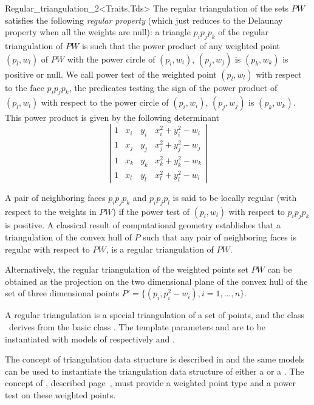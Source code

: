 \begin{ccRefClass}{Regular_triangulation_2<Traits,Tds>}
The regular triangulation of the sets ${  PW}$
satisfies the following {\em regular property} (which just reduces to the 
Delaunay property when all the weights are null):
a triangle $p_ip_jp_k$ of the regular triangulation
of ${  PW}$ is such that the power product of any weighted point
 $(p_l, w_l)$ of ${  PW}$ with the power circle of
 $(p_i, w_i)$, $(p_j, w_j)$ is $(p_k, w_k)$ is positive or null.
We call  power test of the weighted point $(p_l, w_l)$ with respect
to the face  $p_ip_jp_k$, the predicates testing
the sign of 
the power product of $(p_l, w_l)$ with respect to
the power circle of
 $(p_i, w_i)$, $(p_j, w_j)$ is $(p_k, w_k)$. This power product
is given by the following
determinant
\[\left| \begin{array}{cccc}
1  &  x_i  &  y_i  &  x_i ^2 + y_i ^2 - w_i  \\
1  &  x_j  &  y_j  &  x_j ^2 + y_j ^2 - w_j  \\
1  &  x_k  &  y_k  &  x_k ^2 + y_k ^2 - w_k  \\
1  &  x_l  &  y_l  &  x_l ^2 + y_l ^2 - w_l
\end{array}
\right|
\]

A pair of neighboring faces $p_ip_jp_k$
and $p_ip_jp_l$ is said to be locally regular
(with respect to  the weights in ${  PW}$)
if the power test of $(p_l,w_l)$ with respect to
$p_ip_jp_k$ is positive.
A classical  result of computational geometry
establishes that a triangulation of the convex hull of ${  P}$
such that any pair of neighboring faces is regular with respect
to ${  PW}$, is a
 regular triangulation of ${  PW}$.

Alternatively, the regular triangulation
of the weighted points set ${  PW}$
can be obtained as the projection
on the two dimensional plane of the convex hull of the set of three
dimensional points 
${  P'}= \{ (p_i,p_i ^2 - w_i ), i = 1, \ldots , n \}$.



 
A regular triangulation is a special triangulation of a set of points,
and  the class \ccRefName\ derives
from the basic class .
The template parameters  and  
are to be instantiated with models of respectively
  and
.


The concept of triangulation data structure
is described in 
and the same models can be used to instantiate the
triangulation data structure of either a 
or a \ccRefName.
The  concept of ,
described page~, 
must provide a weighted point type
and a power test on these weighted points. 


\end{ccRefClass}
